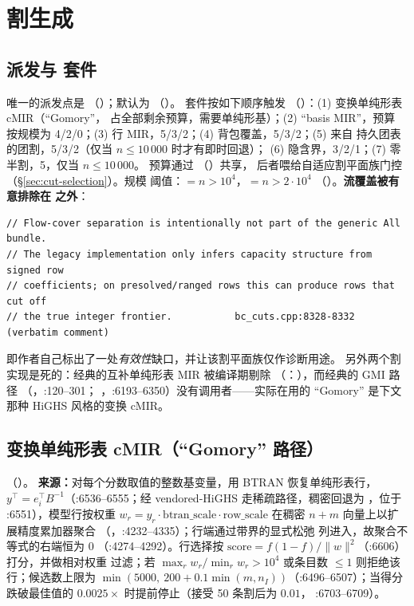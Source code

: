 \documentclass[11pt]{ctexart}
\begin{document}
\section{割生成}
\label{sec:cuts}

\subsection{派发与  套件}
唯一的派发点是 
（）；默认为 
（）。 套件按如下顺序触发
（）：(1) 变换单纯形表 cMIR（``Gomory''，
占全部剩余预算，需要单纯形基）；(2) ``basis MIR''，预算
按规模为 4/2/0；(3) 行 MIR，5/3/2；(4) 背包覆盖，5/3/2；(5) 来自
持久团表的团割，5/3/2（仅当 $n \le 10\,000$ 时才有即时回退）；
(6) 隐含界，3/2/1；(7) 零半割，5，仅当 $n \le 10\,000$。
预算通过 （）共享，
后者喂给自适应割平面族门控（\S\ref{sec:cut-selection}）。规模
阈值：$=n>10^4$，$=n>2\cdot 10^4$
（）。\textbf{流覆盖被有意排除在
 之外}：
\begin{lstlisting}[style=code]
// Flow-cover separation is intentionally not part of the generic All bundle.
// The legacy implementation only infers capacity structure from signed row
// coefficients; on presolved/ranged rows this can produce rows that cut off
// the true integer frontier.           bc_cuts.cpp:8328-8332 (verbatim comment)
\end{lstlisting}
即作者自己标出了一处\emph{有效性}缺口，并让该割平面族仅作诊断用途。
另外两个割实现是死的：经典的互补单纯形表 MIR 被编译期剔除
（：），而经典的 GMI 路径
（，:120--301；
，:6193--6350）没有调用者——实际在用的
``Gomory'' 是下文那种 HiGHS 风格的变换 cMIR。

\subsection{变换单纯形表 cMIR（``Gomory'' 路径）}
\label{sec:cmir}
（）。
\textbf{来源：}对每个分数取值的整数基变量，用 BTRAN 恢复单纯形表行，
$y^\top = e_i^\top B^{-1}$（:6536--6555；经 vendored-HiGHS
 走稀疏路径，稠密回退为
，位于 :6551），模型行按权重
$w_r = y_r \cdot \mathrm{btran\_scale} \cdot \mathrm{row\_scale}$
在稠密 $n{+}m$ 向量上以扩展精度累加器聚合
（，:4232--4335）；行端通过带界的显式松弛
列进入，故聚合不等式的右端恒为 $0$
（:4274--4292）。行选择按
$\mathrm{score} = f(1-f)/\lVert w \rVert^2$（:6606）打分，并做相对权重
过滤；若 $\max_r w_r / \min_r w_r > 10^4$ 或条目数 $\le 1$
则拒绝该行；候选数上限为
$\min(5000,\ 200 + 0.1\min(m, n_I))$（:6496--6507）；当得分跌破最佳值的
$0.0025\times$ 时提前停止（接受 50 条割后为 $0.01$，
:6703--6709）。
\end{document}
